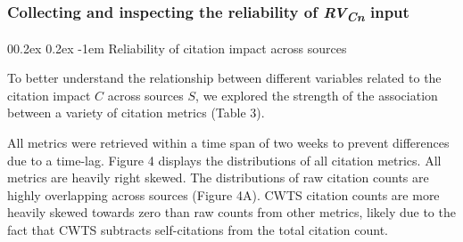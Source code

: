 \documentclass[
  man,floatsintext]{apa6}
\makeatletter
\let\oldparagraph\paragraph
\renewcommand{\paragraph}[1]{\oldparagraph{#1}\mbox{}}
\renewcommand{\paragraph}{\@startsection{paragraph}{4}{\parindent}%
  {0\baselineskip \@plus 0.2ex \@minus 0.2ex}%
  {-1em}%
  {\normalfont\normalsize\bfseries\itshape\typesectitle}}
\makeatother
\begin{document}
\hypertarget{collecting-and-inspecting-the-reliability-of-rvcn-input}{%
\subsubsection{\texorpdfstring{Collecting and inspecting the reliability of \emph{RV\textsubscript{Cn}} input}{Collecting and inspecting the reliability of RVCn input}}\label{collecting-and-inspecting-the-reliability-of-rvcn-input}}

\hypertarget{reliability-of-citation-impact-across-sources}{%
\paragraph{Reliability of citation impact across sources}\label{reliability-of-citation-impact-across-sources}}

To better understand the relationship between different variables related to the citation impact \(C\) across sources \(S\), we explored the strength of the association between a variety of citation metrics (Table 3).

All metrics were retrieved within a time span of two weeks to prevent differences due to a time-lag. Figure 4 displays the distributions of all citation metrics. All metrics are heavily right skewed. The distributions of raw citation counts are highly overlapping across sources (Figure 4A). CWTS citation counts are more heavily skewed towards zero than raw counts from other metrics, likely due to the fact that CWTS subtracts self-citations from the total citation count.

\hfill\break
\end{document}
